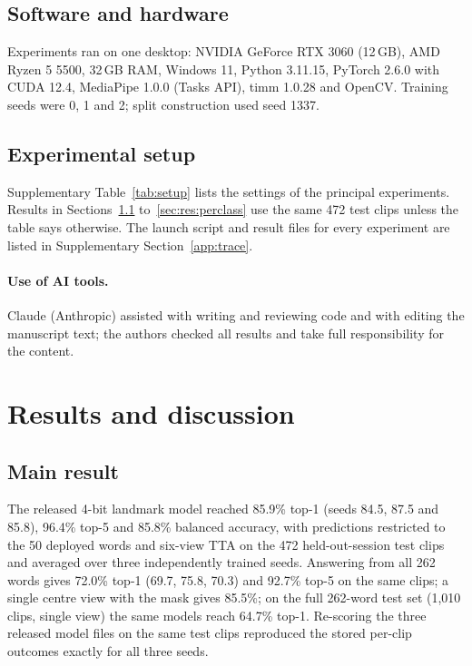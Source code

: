 \documentclass[pdflatex,sn-mathphys-num,twocolumn,lineno]{sn-jnl}
\theoremstyle{thmstyleone}%
\begin{document}
\subsection{Software and hardware}
Experiments ran on one desktop: NVIDIA GeForce RTX 3060 (12\,GB), AMD Ryzen 5 5500, 32\,GB RAM, Windows 11, Python 3.11.15, PyTorch 2.6.0 with CUDA 12.4, MediaPipe 1.0.0 (Tasks API), timm 1.0.28 and OpenCV. Training seeds were 0, 1 and 2; split construction used seed 1337.

\subsection{Experimental setup}\label{sec:setup}

Supplementary Table~\ref{tab:setup} lists the settings of the principal experiments. Results in Sections~\ref{sec:res:main} to~\ref{sec:res:perclass} use the same 472 test clips unless the table says otherwise. The launch script and result files for every experiment are listed in Supplementary Section~\ref{app:trace}.

\paragraph{Use of AI tools.} Claude (Anthropic) assisted with writing and reviewing code and with editing the manuscript text; the authors checked all results and take full responsibility for the content.

\section{Results and discussion}\label{sec:results}

\subsection{Main result}\label{sec:res:main}

The released 4-bit landmark model reached 85.9\% top-1 (seeds 84.5, 87.5 and 85.8), 96.4\% top-5 and 85.8\% balanced accuracy, with predictions restricted to the 50 deployed words and six-view TTA on the 472 held-out-session test clips and averaged over three independently trained seeds. Answering from all 262 words gives 72.0\% top-1 (69.7, 75.8, 70.3) and 92.7\% top-5 on the same clips; a single centre view with the mask gives 85.5\%; on the full 262-word test set (1,010 clips, single view) the same models reach 64.7\% top-1. Re-scoring the three released model files on the same test clips reproduced the stored per-clip outcomes exactly for all three seeds.
\end{document}
